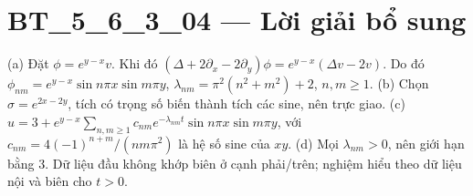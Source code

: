 \documentclass[10pt,a4paper]{article}
\begin{document}
\section*{BT\_5\_6\_3\_04 — Lời giải bổ sung}
(a) Đặt $\phi=e^{y-x}v$. Khi đó $(\Delta+2\partial_x-2\partial_y)\phi=e^{y-x}(\Delta v-2v)$. Do đó $\phi_{nm}=e^{y-x}\sin n\pi x\sin m\pi y$, $\lambda_{nm}=\pi^2(n^2+m^2)+2$, $n,m\ge1$.
(b) Chọn $\sigma=e^{2x-2y}$, tích có trọng số biến thành tích các sine, nên trực giao.
(c) $u=3+e^{y-x}\sum_{n,m\ge1}c_{nm}e^{-\lambda_{nm}t}\sin n\pi x\sin m\pi y$, với $c_{nm}=4(-1)^{n+m}/(nm\pi^2)$ là hệ số sine của $xy$.
(d) Mọi $\lambda_{nm}>0$, nên giới hạn bằng 3. Dữ liệu đầu không khớp biên ở cạnh phải/trên; nghiệm hiểu theo dữ liệu nội và biên cho $t>0$.
\end{document}
